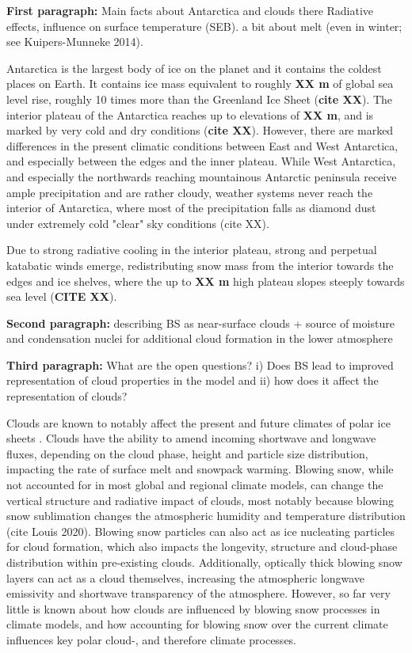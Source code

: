 \documentclass[12pt]{article}
\begin{document}
\textbf{First paragraph:} Main facts about Antarctica and clouds there
Radiative effects, influence on surface temperature (SEB). a bit about melt (even in winter; see Kuipers-Munneke 2014).

Antarctica is the largest body of ice on the planet and it contains the coldest places on Earth.  It contains ice mass equivalent to roughly \textbf{XX m} of global sea level rise, roughly 10 times more than the Greenland Ice Sheet (\textbf{cite XX}). The interior plateau of the Antarctica reaches up to elevations of \textbf{XX m}, and is marked by very cold and dry conditions (\textbf{cite XX}). However, there are marked differences in the present climatic conditions between East and West Antarctica, and especially between the edges and the inner plateau. While West Antarctica, and especially the northwards reaching mountainous Antarctic peninsula receive ample precipitation and are rather cloudy, weather systems never reach the interior of Antarctica, where most of the precipitation falls as diamond dust under extremely cold  "clear" sky conditions (cite XX). 

Due to strong radiative cooling in the interior plateau, strong and perpetual katabatic winds emerge, redistributing snow mass from the interior towards the edges and ice shelves, where the up to \textbf{XX m} high plateau slopes steeply towards sea level (\textbf{CITE XX}). 

\textbf{Second paragraph:} describing BS as near-surface clouds + source of moisture and condensation nuclei for additional cloud formation in the lower atmosphere

\textbf{Third paragraph:} What are the open questions? 
i) Does BS lead to improved representation of cloud properties in the model and ii) how does it affect the representation of clouds?

Clouds are known to notably affect the present and future climates of polar ice sheets \cite{Hofer2017, Hofer2019, VanTricht2016, Izeboud2020, Hahn2019}. Clouds have the ability to amend incoming shortwave and longwave fluxes, depending on the cloud phase, height and particle size distribution, impacting the rate of surface melt and snowpack warming. Blowing snow, while not accounted for in most global and regional climate models, can change the vertical structure and radiative impact of clouds, most notably because blowing snow sublimation changes the atmospheric humidity and temperature distribution (cite Louis 2020). Blowing snow particles can also act as ice nucleating particles for cloud formation, which also impacts the longevity, structure and cloud-phase distribution within pre-existing clouds. Additionally, optically thick blowing snow layers can act as a cloud themselves, increasing the atmospheric longwave emissivity and shortwave transparency of the atmosphere. However, so far very little is known about how clouds are influenced by blowing snow processes in climate models, and how accounting for blowing snow over the current climate influences key polar cloud-, and therefore climate processes.
\end{document}
